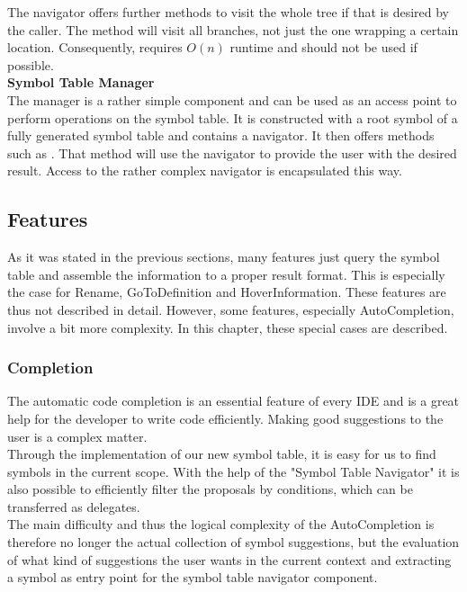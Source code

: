 The navigator offers further methods to visit the whole tree if that is desired by the caller.
The method  will visit all branches, not just the one wrapping a certain location.
Consequently,  requires $O(n)$ runtime and should not be used if possible.\\



\textbf{Symbol Table Manager}\\
The manager is a rather simple component and can be used as an access point to perform operations on the symbol table.
It is constructed with a root symbol of a fully generated symbol table and contains a navigator.
It then offers methods such as .
That method will use the navigator to provide the user with the desired result.
Access to the rather complex navigator is encapsulated this way.



\subsection{Features}
\label{section:imp:features}
As it was stated in the previous sections, many features just query the symbol table and assemble the information to a proper result format.
This is especially the case for Rename, GoToDefinition and HoverInformation.
These features are thus not described in detail.
However, some features, especially AutoCompletion, involve a bit more complexity.
In this chapter, these special cases are described.

\subsubsection{Completion}
\label{section:implementation:core:completion}
The automatic code completion is an essential feature of every IDE and is a great help for the developer to write code efficiently.
Making good suggestions to the user is a complex matter. \\

Through the implementation of our new symbol table, it is easy for us to find symbols in the current scope.
With the help of the "Symbol Table Navigator"
it is also possible to efficiently filter the proposals by conditions,
which can be transferred as delegates. \\

The main difficulty and thus the logical complexity of the AutoCompletion
is therefore no longer the actual collection of symbol suggestions,
but the evaluation of what kind of suggestions the user wants in the current context
and extracting a symbol as entry point for the symbol table navigator component. \\

